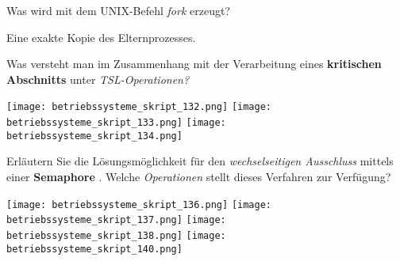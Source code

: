 \documentclass{article}
\begin{document}
\begin{tcolorbox}[colback=white!10!white,colframe=lightgray!75!black,
  savelowerto=\jobname_ex.tex,breakable,enhanced,lines before break=40]

\begin{center}
Was wird mit dem UNIX-Befehl 
\textit{fork
} erzeugt?

\end{center}

\tcblower

\justifying
Eine exakte Kopie des Elternprozesses.

\end{tcolorbox}
\begin{tcolorbox}[colback=white!10!white,colframe=lightgray!75!black,
  savelowerto=\jobname_ex.tex,breakable,enhanced,lines before break=40]

\begin{center}
Was versteht man im Zusammenhang mit der Verarbeitung eines 
\textbf{kritischen Abschnitts
} unter 
\textit{TSL-Operationen?
}
\end{center}

\tcblower

\justifying
\texttt{[image: betriebssysteme\_skript\_132.png]}
\texttt{[image: betriebssysteme\_skript\_133.png]}
\texttt{[image: betriebssysteme\_skript\_134.png]}

\end{tcolorbox}
\begin{tcolorbox}[colback=white!10!white,colframe=lightgray!75!black,
  savelowerto=\jobname_ex.tex,breakable,enhanced,lines before break=40]

\begin{center}
Erläutern Sie die Lösungsmöglichkeit für den 
\textit{wechselseitigen Ausschluss
} mittels einer 
\textbf{Semaphore
}. Welche 
\textit{Operationen
} stellt dieses Verfahren zur Verfügung?

\end{center}

\tcblower

\justifying
\texttt{[image: betriebssysteme\_skript\_136.png]}
\texttt{[image: betriebssysteme\_skript\_137.png]}
\texttt{[image: betriebssysteme\_skript\_138.png]}
\texttt{[image: betriebssysteme\_skript\_140.png]}

\end{tcolorbox}
\end{document}

